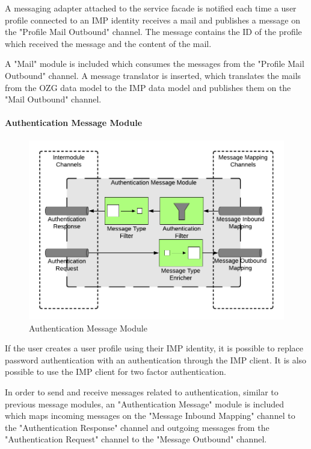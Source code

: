A messaging adapter attached to the service facade is notified each time a user profile connected to an IMP identity receives a mail and publishes a message on the "Profile Mail Outbound" channel. The message contains the ID of the profile which received the message and the content of the mail.

A "Mail" module is included which consumes the messages from the "Profile Mail Outbound" channel. A message translator is inserted, which translates the mails from the OZG data model to the IMP data model and publishes them on the "Mail Outbound" channel.

\paragraph{Authentication Message Module}

\begin{figure}[H]
    \centering
    \includegraphics[scale=0.6]{Diagrams/Integration Architecture 1/Technological Integration/16. Authenticatin Message Module.pdf}
    \caption{Authentication Message Module}
    \label{integration1:authentication_message_module}
\end{figure}

If the user creates a user profile using their IMP identity, it is possible to replace password authentication with an authentication through the IMP client. It is also possible to use the IMP client for two factor authentication.

In order to send and receive messages related to authentication, similar to previous message modules, an "Authentication Message" module is included which maps incoming messages on the "Message Inbound Mapping" channel to the "Authentication Response" channel and outgoing messages from the "Authentication Request" channel to the "Message Outbound" channel.


